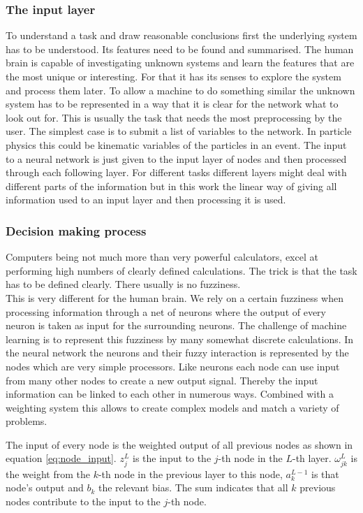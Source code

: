\subsubsection{The input layer}

To understand a task and draw reasonable conclusions first the underlying system has to be understood. Its features need to be found and summarised. The human brain is capable of investigating unknown systems and learn the features that are the most unique or interesting. For that it has its senses to explore the system and process them later. To allow a machine to do something similar the unknown system has to be represented in a way that it is clear for the network what to look out for. This is usually the task that needs the most preprocessing by the user. The simplest case is to submit a list of variables to the network. In particle physics this could be kinematic variables of the particles in an event.
The input to a neural network is just given to the input layer of nodes and then processed through each following layer. For different tasks different layers might deal with different parts of the information but in this work the linear way of giving all information used to an input layer and then processing it is used.

\subsubsection{Decision making process}

Computers being not much more than very powerful calculators, excel at performing high numbers of clearly defined calculations. The trick is that the task has to be defined clearly. There usually is no fuzziness.\\
This is very different for the human brain. We rely on a certain fuzziness when processing information through a net of neurons where the output of every neuron is taken as input for the surrounding neurons. The challenge of machine learning is to represent this fuzziness by many somewhat discrete calculations. In the neural network the neurons and their fuzzy interaction is represented by the nodes which are very simple processors. Like neurons each node can use input from many other nodes to create a new output signal. Thereby the input information can be linked to each other in numerous ways. Combined with a weighting system this allows to create complex models and match a variety of problems.

The input of every node is the weighted output of all previous nodes as shown in equation \eqref{eq:node_input}. $z_j^L$ is the input to the $j$-th node in the $L$-th layer. $\omega_{jk}^L$ is the weight from the $k$-th node in the previous layer to this node, $a_k^{L-1}$ is that node's output and $b_k$ the relevant bias. The sum indicates that all $k$ previous nodes contribute to the input to the $j$-th node.

